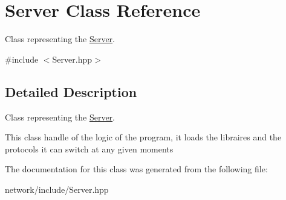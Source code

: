 \hypertarget{class_server}{}\section{Server Class Reference}
\label{class_server}


Class representing the \hyperlink{class_server}{Server}.  




{\ttfamily \#include $<$Server.\+hpp$>$}



\subsection{Detailed Description}
Class representing the \hyperlink{class_server}{Server}. 

This class handle of the logic of the program, it loads the libraires and the protocols it can switch at any given moments 

The documentation for this class was generated from the following file\+:\begin{DoxyCompactItemize}
\item 
network/include/Server.\+hpp\end{DoxyCompactItemize}
